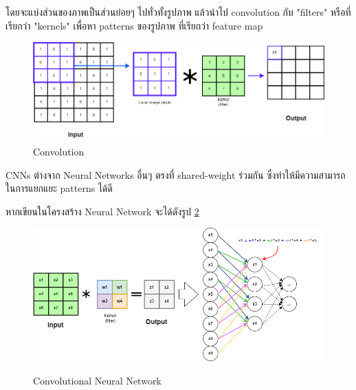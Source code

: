 โดยจะแบ่งส่วนของภาพเป็นส่วนย่อยๆ ไปทั่วทั้งรูปภาพ แล้วนำไป convolution กับ  "filters" หรือที่เรียกว่า "kernels" เพื่อหา patterns ของรูปภาพ ที่เรียกว่า feature map
\begin{figure}[h]
  \begin{center}
   
  \includegraphics[scale=0.35]{pic/model/cnn_1.png}
  \end{center}
  \caption[Convolution]{Convolution}
  \label{fig:Convolution }
  \end{figure}


CNNs ต่างจาก Neural Networks อื่นๆ ตรงที่  shared-weight ร่วมกัน ซึ่งทำให้มีความสามารถในการแยกแยะ patterns ได้ดี


หากเขียนในโครงสร้าง Neural Network จะได้ดังรูป \ref{fig:Convolutional Neural Network}
\begin{figure}[h]
  \begin{center}
 
  \includegraphics[scale=0.35]{pic/model/cnn_nn_1.png}\cite{CNN_mlp}
  \end{center}

  \caption[Convolutional Neural Network]{Convolutional Neural Network}
  \label{fig:Convolutional Neural Network}
  \end{figure}

